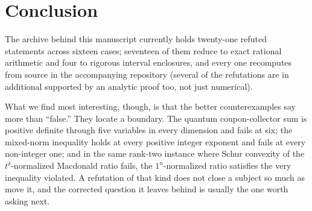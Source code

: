 \section{Conclusion}

\noindent The archive behind this manuscript currently holds twenty-one refuted statements across sixteen cases; seventeen of them reduce to exact rational arithmetic and four to rigorous interval enclosures, and every one recomputes from source in the accompanying repository (several of the refutations are in additional supported by an analytic proof too, not just numerical). %


\vskip5pt
\noindent What we find most interesting, though, is that the better counterexamples say more than ``false.'' They locate a boundary. The quantum coupon-collector sum is positive definite through five variables in every dimension and fails at six; the mixed-norm inequality holds at every positive integer exponent and fails at every non-integer one; and in the same rank-two instance where Schur convexity of the $t^\delta$-normalized Macdonald ratio fails, the $1^n$-normalized ratio satisfies the very inequality violated. A refutation of that kind does not close a subject so much as move it, and the corrected question it leaves behind is usually the one worth asking next.

